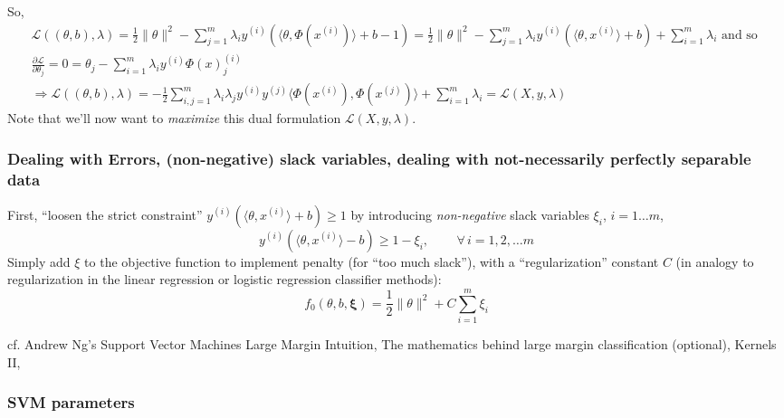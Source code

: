 \documentclass[10pt]{amsart}
\begin{document}
\begin{multicols*}{2}
So,
\begin{equation}
  \begin{gathered}
    \mathcal{L}((\theta,b),\lambda) = \frac{1}{2} \| \theta\|^2 - \sum_{j=1}^m \lambda_i y^{(i)}(\langle \theta, \Phi(x^{(i)}) \rangle + b - 1)   =  \frac{1}{2} \| \theta\|^2 - \sum_{j=1}^m \lambda_i y^{(i)}(\langle \theta, x^{(i)} \rangle + b) +\sum_{i=1}^m \lambda_i \text{ and so } \\
    \frac{ \partial \mathcal{L}}{ \partial \theta_j} = 0 = \theta_j - \sum_{i=1}^m \lambda_i y^{(i)} \Phi(x)^{(i)}_j \\
    \Longrightarrow \mathcal{L}((\theta,b),\lambda) = -\frac{1}{2} \sum_{i,j=1}^m \lambda_i \lambda_j y^{(i)} y^{(j)} \langle \Phi(x^{(i)}) , \Phi(x^{(j)}) \rangle + \sum_{i=1}^m \lambda_i = \mathcal{L}(X,y,\lambda)
    \end{gathered}
  \end{equation}
Note that we'll now want to \emph{maximize} this dual formulation $\mathcal{L}(X,y,\lambda)$.  


\subsubsection{Dealing with Errors, (non-negative) slack variables, dealing with not-necessarily perfectly separable data}\label{SubSec:slackvars}

First, ``loosen the strict constraint'' $y^{(i)}(\langle \theta,x^{(i)} \rangle + b) \geq 1$ by introducing \emph{non-negative} slack variables $\xi_i$, $i=1\dots m$,
\begin{equation}
  y^{(i)}(\langle \theta, x^{(i)} \rangle - b) \geq 1 - \xi_i, \qquad \, \forall \, i = 1,2, \dots m 
\end{equation}
Simply add $\xi$ to the objective function to implement penalty (for ``too much slack''), with a ``regularization'' constant $C$ (in analogy to regularization in the linear regression or logistic regression classifier methods):
\begin{equation}
  f_0(\theta,b,\mathbf{\xi}) = \frac{1}{2} \| \theta \|^2 + C\sum_{i=1}^m \xi_i
  \end{equation}

cf. Andrew Ng's Support Vector Machines Large Margin Intuition, The mathematics behind large margin classification (optional), Kernels II,   

\subsubsection{SVM parameters}  


\end{multicols*}
\end{document}
